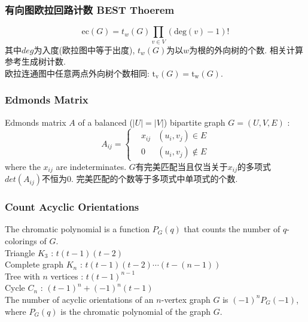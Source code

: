 \subsubsection{有向图欧拉回路计数 BEST Thoerem}
        \[ \mathrm{ec}(G) = t_w(G)\prod_{v \in{V}}(\mathrm{deg}(v) - 1)! \]
        其中$deg$为入度(欧拉图中等于出度), $t_w(G)$为以$w$为根的外向树的个数. 相关计算参考生成树计数.\\
        欧拉连通图中任意两点外向树个数相同: $\mathrm{t_v}(G) = \mathrm{t_w}(G)$.
    \subsubsection{Edmonds Matrix}
        Edmonds matrix $A$ of a balanced ($|U|=|V|$) bipartite graph $G=(U,V,E)$ : 
        \[A_{ij}=\left\{
            \begin{aligned}
                & x_{ij} & (u_i,v_j)\in E\\
                & 0 & (u_i,v_j)\notin E
            \end{aligned}
            \right.\]
        where the $x_{ij}$ are indeterminates. $G$有完美匹配当且仅当关于$x_{ij}$的多项式$det(A_{ij})$不恒为$0$.
        完美匹配的个数等于多项式中单项式的个数.
\subsubsection{Count Acyclic Orientations}
    \noindent
    The chromatic polynomial is a function $P_G(q)$ that counts the number of $q$-colorings of $G$.\\
    Triangle $K_3$ : $t(t-1)(t-2)$\\
    Complete graph $K_n$ : $t(t-1)(t-2)\cdots (t-(n-1))$\\
    Tree with $n$ vertices : $t(t-1)^{n-1}$\\
    Cycle $C_n$ : $(t-1)^{n}+(-1)^{n}(t-1)$\\
    The number of acyclic orientations of an $n$-vertex graph $G$ is $(−1)^nP_G(−1)$, where $P_G(q)$ is the chromatic polynomial of the graph
    $G$.
